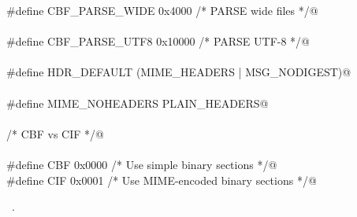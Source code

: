 \documentclass[10pt,a4paper,twoside,notitlepage]{article}
\begin{document}
\begin{flushleft}
\begin{list}{}{}
\mbox{}\verb@#define CBF_PARSE_WIDE      0x4000  /* PARSE wide files                         */@\\
\mbox{}\verb@@\\
\mbox{}\verb@#define CBF_PARSE_UTF8      0x10000 /* PARSE UTF-8                              */@\\
\mbox{}\verb@@\\
\mbox{}\verb@#define HDR_DEFAULT (MIME_HEADERS | MSG_NODIGEST)@\\
\mbox{}\verb@@\\
\mbox{}\verb@#define MIME_NOHEADERS  PLAIN_HEADERS@\\
\mbox{}\verb@@\\
\mbox{}\verb@  /* CBF vs CIF */@\\
\mbox{}\verb@@\\
\mbox{}\verb@#define CBF             0x0000  /* Use simple binary sections         */@\\
\mbox{}\verb@#define CIF             0x0001  /* Use MIME-encoded binary sections   */@\\
\mbox{}\verb@@{\NWsep}
\end{list}
\vspace{-1.5ex}
\footnotesize
\begin{list}{}{\setlength{\itemsep}{-\parsep}\setlength{\itemindent}{-\leftmargin}}
\item \NWtxtMacroRefIn\ .

\item{}
\end{list}
\vspace{4ex}
\end{flushleft}
\end{document}
